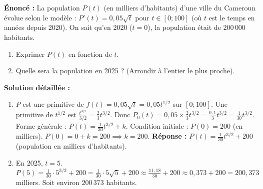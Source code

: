 \documentclass[11pt]{article}
\begin{document}
\begin{exoresolu}
\textbf{Énoncé :} La population $P(t)$ (en milliers d'habitants) d'une ville du Cameroun évolue selon le modèle :
$P'(t) = 0,05 \sqrt{t}$ pour $t \in [0; 100]$ (où $t$ est le temps en années depuis 2020).
On sait qu'en 2020 ($t=0$), la population était de $200\,000$ habitants.
\begin{enumerate}
  \item Exprimer $P(t)$ en fonction de $t$.
  \item Quelle sera la population en 2025 ? (Arrondir à l'entier le plus proche).
\end{enumerate}

\textbf{Solution détaillée :}
\begin{enumerate}
  \item $P$ est une primitive de $f(t) = 0,05 \sqrt{t} = 0,05 t^{1/2}$ sur $[0;100]$.
  Une primitive de $t^{1/2}$ est $\frac{t^{3/2}}{3/2} = \frac{2}{3} t^{3/2}$.
  Donc $P_0(t) = 0,05 \times \frac{2}{3} t^{3/2} = \frac{0,1}{3} t^{3/2} = \frac{1}{30} t^{3/2}$.
  Forme générale : $P(t) = \frac{1}{30} t^{3/2} + k$.
  Condition initiale : $P(0) = 200$ (en milliers).
  $P(0) = 0 + k = 200 \implies k = 200$.
  \textbf{Réponse :} $P(t) = \frac{1}{30} t^{3/2} + 200$ (population en milliers d'habitants).
  
  \item En 2025, $t = 5$.
  $P(5) = \frac{1}{30} \cdot 5^{3/2} + 200 = \frac{1}{30} \cdot 5\sqrt{5} + 200 \approx \frac{11,18}{30} + 200 \approx 0,373 + 200 = 200,373$ milliers.
  Soit environ $200\,373$ habitants.
\end{enumerate}
\end{exoresolu}
\end{document}
